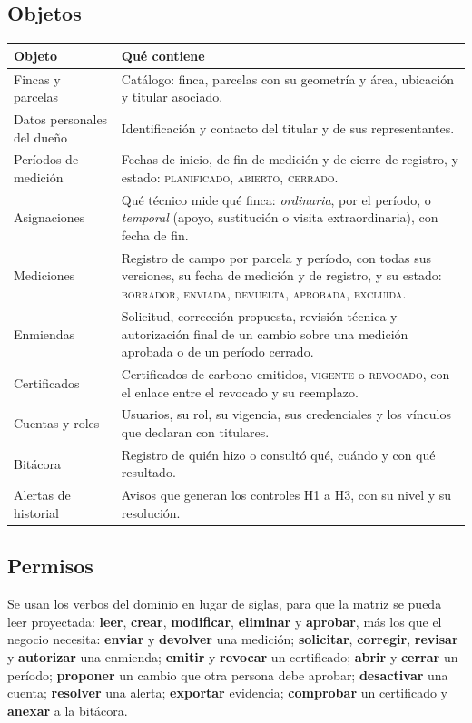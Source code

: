 \documentclass[11pt,letterpaper]{article}
\newcommand{\cab}[1]{\textbf{\rmfamily #1}}
\newcommand{\est}[1]{\textsc{\small #1}}
\begin{document}
\subsection{Objetos}

\begin{center}
\small
\begin{tabularx}{\textwidth}{@{}L{4.3cm} Y@{}}
\toprule
\cab{Objeto} & \cab{Qué contiene} \\
\midrule
Fincas y parcelas & Catálogo: finca, parcelas con su geometría y área, ubicación y titular asociado. \\
Datos personales del dueño & Identificación y contacto del titular y de sus representantes. \\
Períodos de medición & Fechas de inicio, de fin de medición y de cierre de registro, y estado: \est{planificado}, \est{abierto}, \est{cerrado}. \\
Asignaciones & Qué técnico mide qué finca: \emph{ordinaria}, por el período, o \emph{temporal} (apoyo, sustitución o visita extraordinaria), con fecha de fin. \\
Mediciones & Registro de campo por parcela y período, con todas sus versiones, su fecha de medición y de registro, y su estado: \est{borrador}, \est{enviada}, \est{devuelta}, \est{aprobada}, \est{excluida}. \\
Enmiendas & Solicitud, corrección propuesta, revisión técnica y autorización final de un cambio sobre una medición aprobada o de un período cerrado. \\
Certificados & Certificados de carbono emitidos, \est{vigente} o \est{revocado}, con el enlace entre el revocado y su reemplazo. \\
Cuentas y roles & Usuarios, su rol, su vigencia, sus credenciales y los vínculos que declaran con titulares. \\
Bitácora & Registro de quién hizo o consultó qué, cuándo y con qué resultado. \\
Alertas de historial & Avisos que generan los controles H1 a H3, con su nivel y su resolución. \\
\bottomrule
\end{tabularx}
\end{center}

\subsection{Permisos}

Se usan los verbos del dominio en lugar de siglas, para que la matriz se pueda leer proyectada:
\textbf{leer}, \textbf{crear}, \textbf{modificar}, \textbf{eliminar} y \textbf{aprobar}, más los que el negocio
necesita: \textbf{enviar} y \textbf{devolver} una medición; \textbf{solicitar}, \textbf{corregir}, \textbf{revisar} y
\textbf{autorizar} una enmienda; \textbf{emitir} y \textbf{revocar} un certificado; \textbf{abrir} y \textbf{cerrar} un
período; \textbf{proponer} un cambio que otra persona debe aprobar; \textbf{desactivar} una cuenta;
\textbf{resolver} una alerta; \textbf{exportar} evidencia; \textbf{comprobar} un certificado y \textbf{anexar} a la
bitácora.
\end{document}
